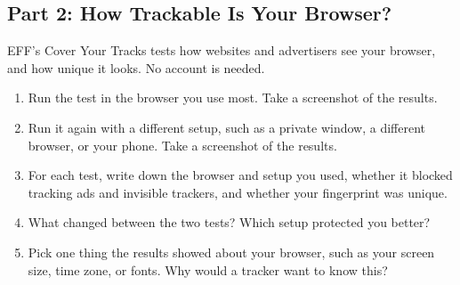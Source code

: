 \documentclass[12pt]{article}
\begin{document}
\subsection*{Part 2: How Trackable Is Your Browser?}
EFF's Cover Your Tracks tests how websites and advertisers see your browser, and how unique it looks. No account is needed.
\begin{enumerate}[start=5]
    \item Run the test in the browser you use most. Take a screenshot of the results.
    \item Run it again with a different setup, such as a private window, a different browser, or your phone. Take a screenshot of the results.
    \item For each test, write down the browser and setup you used, whether it blocked tracking ads and invisible trackers, and whether your fingerprint was unique.
    \item What changed between the two tests? Which setup protected you better?
    \item Pick one thing the results showed about your browser, such as your screen size, time zone, or fonts. Why would a tracker want to know this?
\end{enumerate}
\end{document}
